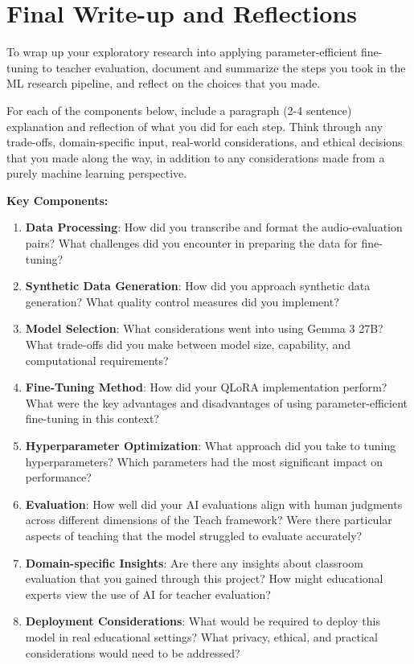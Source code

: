 \documentclass[11pt]{article}
\begin{document}
\section{Final Write-up and Reflections}

To wrap up your exploratory research into applying parameter-efficient fine-tuning to teacher evaluation, document and summarize the steps you took in the ML research pipeline, and reflect on the choices that you made.

For each of the components below, include a paragraph (2-4 sentence) explanation and reflection of what you did for each step. Think through any trade-offs, domain-specific input, real-world considerations, and ethical decisions that you made along the way, in addition to any considerations made from a purely machine learning perspective.

\textbf{Key Components:}

\begin{enumerate}
    \item \textbf{Data Processing}: How did you transcribe and format the audio-evaluation pairs? What challenges did you encounter in preparing the data for fine-tuning?

    \item \textbf{Synthetic Data Generation}: How did you approach synthetic data generation? What quality control measures did you implement?

    \item \textbf{Model Selection}: What considerations went into using Gemma 3 27B? What trade-offs did you make between model size, capability, and computational requirements?

    \item \textbf{Fine-Tuning Method}: How did your QLoRA implementation perform? What were the key advantages and disadvantages of using parameter-efficient fine-tuning in this context?

    \item \textbf{Hyperparameter Optimization}: What approach did you take to tuning hyperparameters? Which parameters had the most significant impact on performance?

    \item \textbf{Evaluation}: How well did your AI evaluations align with human judgments across different dimensions of the Teach framework? Were there particular aspects of teaching that the model struggled to evaluate accurately?

    \item \textbf{Domain-specific Insights}: Are there any insights about classroom evaluation that you gained through this project? How might educational experts view the use of AI for teacher evaluation?

    \item \textbf{Deployment Considerations}: What would be required to deploy this model in real educational settings? What privacy, ethical, and practical considerations would need to be addressed?
\end{enumerate}
\end{document}
